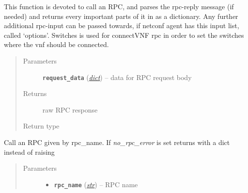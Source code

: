 \documentclass[letterpaper,10pt,english]{sphinxmanual}
\begin{document}
\begin{fulllineitems}
\begin{fulllineitems}
\end{fulllineitems}


\begin{fulllineitems}
\label{util/netconf:escape.util.netconf.AbstractNETCONFAdapter._invoke_rpc}
This function is devoted to call an RPC, and parses the rpc-reply message
(if needed) and returns every important parts of it in as a dictionary.
Any further additional rpc-input can be passed towards, if netconf agent
has this input list, called `options'. Switches is used for connectVNF
rpc in order to set the switches where the vnf should be connected.
\begin{quote}\begin{description}
\item[{Parameters}] \leavevmode
\textbf{\texttt{request\_data}} (\href{https://docs.python.org/2.7/library/stdtypes.html\#dict}{\emph{dict}}) -- data for RPC request body

\item[{Returns}] \leavevmode
raw RPC response

\item[{Return type}] \leavevmode
{}

\end{description}\end{quote}

\end{fulllineitems}


\begin{fulllineitems}
\label{util/netconf:escape.util.netconf.AbstractNETCONFAdapter.call_RPC}
Call an RPC given by rpc\_name. If \emph{no\_rpc\_error} is set returns with a
dict instead of raising 
\begin{quote}\begin{description}
\item[{Parameters}] \leavevmode\begin{itemize}
\item {} 
\textbf{\texttt{rpc\_name}} (\href{https://docs.python.org/2.7/library/functions.html\#str}{\emph{str}}) -- RPC name


\end{itemize}
\end{description}
\end{quote}
\end{fulllineitems}
\end{fulllineitems}
\end{document}
